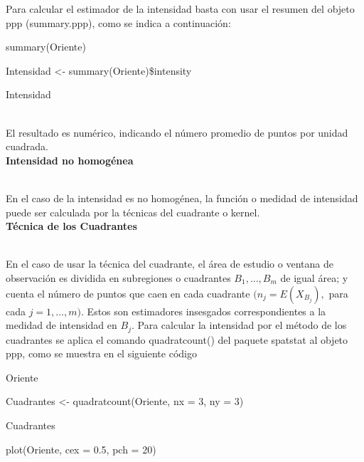 \documentclass[12pt]{report}
\begin{document}
{{Para calcular el estimador de la  intensidad basta con usar el resumen del objeto ppp (summary.ppp), como se indica a continuación:\\


	{ \scriptsize  { \ttfamily	

		 
  summary(Oriente)  
  
  Intensidad  <- summary(Oriente)\$intensity \vspace{-0,15 cm} 
  
  Intensidad }}  	\\
  
  
  El resultado es numérico,  indicando el número  promedio de puntos por unidad cuadrada.\\
  
 
	
						

  \textbf{Intensidad no homogénea}{\label{Intensidad_no_homogenes}\\
	
	 En el caso de la intensidad es no homogénea, la función o medidad de intensidad  puede ser calculada por la técnicas del cuadrante o kernel. \\ 
	 
  \textbf{Técnica de los Cuadrantes}{\label{TCuadrantes}\\
	 		
	 En el caso de usar la técnica del cuadrante, el área de estudio o ventana de observación es dividida en subregiones o cuadrantes $ B_{1}, \dots, B_{m} $ de igual área; y cuenta el número de puntos que caen en cada cuadrante $ ( n_{j}  = E( X_{B_{j}} ),$ 	  para cada  $ j = 1, \dots, m ).$   Estos  son  estimadores insesgados correspondientes a la medidad de intensidad en $B_{j}.$ 	Para calcular la intensidad por el método de los cuadrantes se aplica el comando quadratcount() del paquete spatstat  al objeto ppp, como se muestra en el siguiente  código \\	
	
	
	{ \scriptsize  { \ttfamily	
		Oriente
				
	Cuadrantes <- quadratcount(Oriente, nx = 3, ny = 3)  
	
	Cuadrantes
		
	plot(Oriente, cex = 0.5, pch = 20) \vspace{-0,15 cm}
	
}}}}}}
\end{document}
